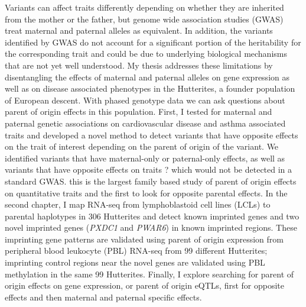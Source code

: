 \abstract

Variants can affect traits differently depending on whether they are inherited from the mother or the father, but genome wide association studies (GWAS) treat maternal and paternal alleles as equivalent. In addition, the variants identified by GWAS do not account for a significant portion of the heritability for the corresponding trait and could be due to underlying biological mechanisms that are not yet well understood. My thesis addresses these limitations by disentangling the effects of maternal and paternal alleles on gene expression as well as on disease associated phenotypes in the Hutterites, a founder population of European descent. With phased genotype data we can ask questions about parent of origin effects in this population. First, I tested for maternal and paternal genetic associations on cardiovascular disease and asthma associated traits and developed a novel method to detect variants that have opposite effects on the trait of interest depending on the parent of origin of the variant. We identified variants that have maternal-only or paternal-only effects, as well as variants that have opposite effects on traits ? which would not be detected in a standard GWAS. this is the largest family based study of parent of origin effects on quantitative traits and the first to look for opposite parental effects. In the second chapter, I map RNA-seq from lymphoblastoid cell lines (LCLs) to parental haplotypes in 306  Hutterites and detect known imprinted genes and two novel imprinted genes (\emph{PXDC1} and \emph{PWAR6}) in known imprinted regions. These imprinting gene patterns are validated using parent of origin expression from peripheral blood leukocyte (PBL) RNA-seq from 99 different Hutterites; imprinting control regions near the novel genes are validated using PBL methylation in the same 99 Hutterites. Finally, I explore searching for parent of origin effects on gene expression, or parent of origin eQTLs, first for opposite effects and then maternal and paternal specific effects. 